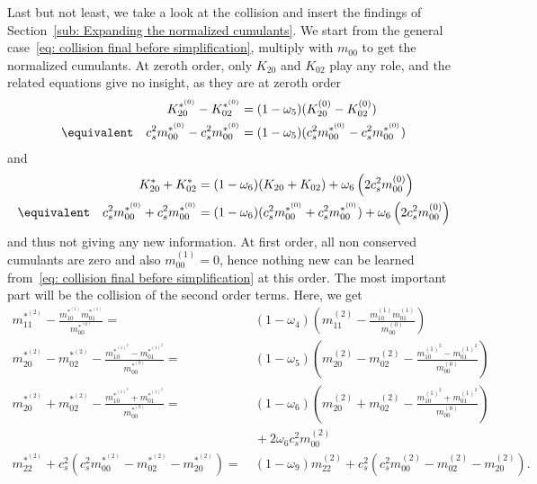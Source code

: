Last but not least, we take a look at the collision and insert the findings of Section~\ref{sub: Expanding the normalized cumulants}.
We start from the general case~\eqref{eq: collision final before simplification}, multiply with $m_{00}$ to get the normalized cumulants.
At zeroth order, only $K_{20}$ and $K_{02}$ play any role, and the related equations give no insight, as they are at zeroth order
\begin{equation}
  \begin{aligned}
    &&K_{20}^{*^{(0)}} - K_{02}^{*^{(0)}}
      & = (1-\omega_5) (K_{20}^{(0)} - K_{02}^{(0)}) \\
    &\equivalent& c_s^2 m_{00}^{*^{(0)}} - c_s^2 m_{00}^{*^{(0)}}
        & = (1-\omega_5) (c_s^2 m_{00}^{*^{(0)}} - c_s^2 m_{00}^{*^{(0)}})
  \end{aligned}
\end{equation}
and
\begin{equation}
  \begin{aligned}
    &&K_{20}^{*} + K_{02}^{*}
      & = (1-\omega_6)(K_{20} + K_{02}) + \omega_6 \left( 2 c_s^2 m_{00}^{(0)} \right) \\
    &\equivalent& c_s^2 m_{00}^{*^{(0)}} + c_s^2 m_{00}^{*^{(0)}}
      & = (1-\omega_6)(c_s^2 m_{00}^{*^{(0)}} + c_s^2 m_{00}^{*^{(0)}}) + \omega_6 \left( 2 c_s^2 m_{00}^{(0)} \right) \\
  \end{aligned}
\end{equation}
and thus not giving any new information.
At first order, all non conserved cumulants are zero and also $m_{00}^{(1)}=0$, hence nothing new can be learned from~\eqref{eq: collision final before simplification} at this order.
The most important part will be the collision of the second order terms.
Here, we get
\begin{align}
  \label{eq: collide moments 11_2 raw}
  m_{11}^{*^{(2)}} - \frac{ m_{10}^{*^{(1)}}m_{01}^{*^{(1)}}}{m_{00}^{*^{(0)}}} =&\ (1-\omega_4)\left(m_{11}^{(2)} - \frac{ m_{10}^{(1)}m_{01}^{(1)}}{m_{00}^{(0)}}\right)
  \\
  \label{eq: collide moments 20m02_2 raw}
  m_{20}^{*^{(2)}}-m_{02}^{*^{(2)}} - \frac{ m_{10}^{*^{{(1)}^2}} - m_{01}^{*^{{(1)}^2}}}{m_{00}^{*^{(0)}}} =&\ (1-\omega_5) \left(m_{20}^{(2)}-m_{02}^{(2)} - \frac{ m_{10}^{{(1)}^2} - m_{01}^{{(1)}^2}}{m_{00}^{(0)}}\right)
  \\
  \label{eq: collide moments 20p02_2 raw}
  m_{20}^{*^{(2)}}+m_{02}^{*^{(2)}} - \frac{ m_{10}^{*^{{(1)}^2}} + m_{01}^{*^{{(1)}^2}}}{m_{00}^{*^{(0)}}}
  =&\ (1-\omega_6)\left(  m_{20}^{(2)}+m_{02}^{(2)} - \frac{ m_{10}^{{(1)}^2} + m_{01}^{{(1)}^2}}{m_{00}^{(0)}}\right)
  \\\nonumber&\ + 2\omega_6 c_s^2 m_{00}^{(2)}
  \\
  \label{eq: collide moments 22_2 raw}
  m_{22}^{*^{(2)}}
  + c_s^2\left(c_s^2 m_{00}^{*^{(2)}}
  - m_{02}^{*^{(2)}}
  - m_{20}^{*^{(2)}} \right)
  =&\ (1-\omega_9)m_{22}^{(2)}
  + c_s^2\left(c_s^2 m_{00}^{(2)}
  - m_{02}^{(2)}
  - m_{20}^{(2)}    \right).
\end{align}
